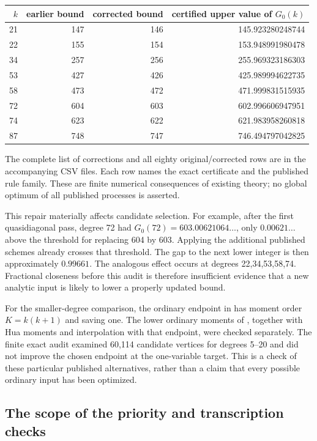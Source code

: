 \documentclass[11pt,letterpaper]{article}
\numberwithin{equation}{section}
\begin{document}
\begin{center}
\begin{tabular}{rrrr}
\hline
$k$ & earlier bound & corrected bound & certified upper value of $G_0(k)$\\
\hline
21 & 147 & 146 & 145.923280248744\\
22 & 155 & 154 & 153.948991980478\\
34 & 257 & 256 & 255.969323186303\\
53 & 427 & 426 & 425.989994622735\\
58 & 473 & 472 & 471.999831515935\\
72 & 604 & 603 & 602.996606947951\\
74 & 623 & 622 & 621.983958260818\\
87 & 748 & 747 & 746.494797042825\\
\hline
\end{tabular}
\end{center}

The complete list of corrections and all eighty original/corrected rows
are in the accompanying CSV files. Each row names the exact certificate
and the published rule family. These are finite numerical consequences of
existing theory; no global optimum of all published processes is asserted.

This repair materially affects candidate selection. For example, after the
first quasidiagonal pass, degree 72 had $G_0(72)=603.00621064\ldots$, only
$0.00621\ldots$ above the threshold for replacing 604 by 603. Applying the
additional published schemes already crosses that threshold. The gap to
the next lower integer is then approximately $0.99661$. The analogous
effect occurs at degrees 22,34,53,58,74. Fractional closeness before this
audit is therefore insufficient evidence that a new analytic input is
likely to lower a properly updated bound.

For the smaller-degree comparison, the ordinary endpoint in
\cite[Lemma~3.1]{W16} has moment order $K=k(k+1)$ and saving one.
The lower ordinary moments of \cite[Theorem~10]{Bou16}, together with
Hua moments and interpolation with that endpoint, were checked separately.
The finite exact audit examined 60,114 candidate vertices for degrees 5--20
and did not improve the chosen endpoint at the one-variable target. This
is a check of these particular published alternatives, rather than a
claim that every possible ordinary input has been optimized.

\subsection{The scope of the priority and transcription checks}
\end{document}
